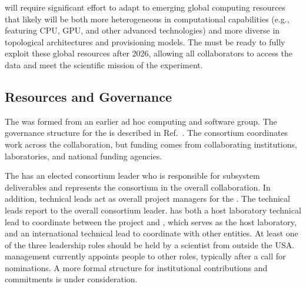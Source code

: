  will require significant effort to adapt to emerging  %
global computing resources that %
  likely will be both more heterogeneous in computational capabilities (e.g., featuring CPU, GPU, and other advanced technologies) and more diverse in topological architectures and provisioning models.  The   must %
be ready to fully exploit these global resources %
after 2026, allowing all collaborators to access the data and meet the scientific mission of the experiment.  

\subsection{Resources and Governance}
\label{sec:exec-comp-res}

The  was formed from an earlier ad hoc  computing and software group. %
The governance structure for the  is described in Ref.~\cite{bib:docdb12751}.  The consortium coordinates work across the collaboration, but funding comes from collaborating institutions, laboratories, and national funding agencies. %

The %
 has an elected consortium leader %
who is responsible for subsystem deliverables and represents the consortium in the overall  collaboration.
In addition, technical leads act as overall project managers for the . The technical leads report to the overall consortium leader.
 has both a host laboratory technical lead to coordinate between the  project and \fnal, which serves as the host laboratory, and an international technical lead to coordinate with other entities.
At least one of the three leadership roles should be held by a scientist from outside the USA. 
 management currently %
appoints people to other roles, typically after a call for nominations.  A more formal structure for institutional contributions and commitments is under consideration. 

